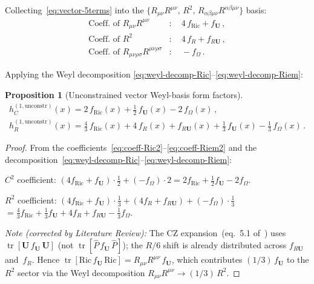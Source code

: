 \documentclass[12pt,a4paper]{article}
\newtheorem{proposition}{Proposition}[section]
\theoremstyle{definition}
\theoremstyle{remark}
\newcommand{\tr}{\operatorname{tr}}
\newcommand{\Rsq}{R_{\mu\nu\rho\sigma}R^{\mu\nu\rho\sigma}}
\newcommand{\Ricsq}{R_{\mu\nu}R^{\mu\nu}}
\begin{document}
Collecting~\eqref{eq:vector-5terms} into the
$\{R_{\mu\nu}R^{\mu\nu},\,R^2,\,R_{\alpha\beta\mu\nu}R^{\alpha\beta\mu\nu}\}$
basis:
\begin{align}
  \text{Coeff.\ of } \Ricsq &:
  \quad 4\,f_{\mathrm{Ric}} + f_{\mathbf{U}}\,,
  \label{eq:coeff-Ric2}\\
  \text{Coeff.\ of } R^2 &:
  \quad 4\,f_R + f_{R\mathbf{U}}\,,
  \label{eq:coeff-R2-raw}\\
  \text{Coeff.\ of } \Rsq &:
  \quad -f_\Omega\,.
  \label{eq:coeff-Riem2}
\end{align}

Applying the Weyl decomposition
\eqref{eq:weyl-decomp-Ric}--\eqref{eq:weyl-decomp-Riem}:

\begin{proposition}[Unconstrained vector Weyl-basis form factors]
\label{prop:hC-hR-unconstr}
\begin{align}
  \boxed{
  h_C^{(1,\mathrm{unconstr})}(x)
  = 2\,f_{\mathrm{Ric}}(x) + \frac{1}{2}\,f_{\mathbf{U}}(x)
    - 2\,f_\Omega(x)\,,
  }
  \label{eq:hC-unconstr}\\[6pt]
  \boxed{
  h_R^{(1,\mathrm{unconstr})}(x)
  = \frac{4}{3}\,f_{\mathrm{Ric}}(x) + 4\,f_R(x)
    + f_{R\mathbf{U}}(x)
    + \frac{1}{3}\,f_{\mathbf{U}}(x)
    - \frac{1}{3}\,f_\Omega(x)\,.
  }
  \label{eq:hR-unconstr}
\end{align}
\end{proposition}

\begin{proof}
From the coefficients~\eqref{eq:coeff-Ric2}--\eqref{eq:coeff-Riem2}
and the decomposition~\eqref{eq:weyl-decomp-Ric}--\eqref{eq:weyl-decomp-Riem}:

$C^2$ coefficient:
$(4f_{\mathrm{Ric}} + f_{\mathbf{U}})\cdot\frac{1}{2}
+ (-f_\Omega)\cdot 2
= 2f_{\mathrm{Ric}} + \frac{1}{2}f_{\mathbf{U}} - 2f_\Omega$.

$R^2$ coefficient:
$(4f_{\mathrm{Ric}} + f_{\mathbf{U}})\cdot\frac{1}{3}
+ (4f_R + f_{R\mathbf{U}})
+ (-f_\Omega)\cdot\frac{1}{3}$
$= \frac{4}{3}f_{\mathrm{Ric}} + \frac{1}{3}f_{\mathbf{U}}
+ 4f_R + f_{R\mathbf{U}}
- \frac{1}{3}f_\Omega$.

\textit{Note (corrected by Literature Review):} The CZ expansion~(eq.~5.1
of~\cite{CZ2012}) uses $\tr[\mathbf{U}\,f_{\mathbf{U}}\,\mathbf{U}]$
(not $\tr[\hat{P}\,f_{\mathbf{U}}\,\hat{P}]$); the $R/6$ shift is
already distributed across $f_{R\mathbf{U}}$ and~$f_R$.
Hence $\tr[\mathrm{Ric}\,f_{\mathbf{U}}\,\mathrm{Ric}]
= \Ricsq\,f_{\mathbf{U}}$, which contributes $(1/3)\,f_{\mathbf{U}}$
to the $R^2$ sector via the Weyl decomposition
$\Ricsq \to (1/3)\,R^2$.
\end{proof}
\end{document}
